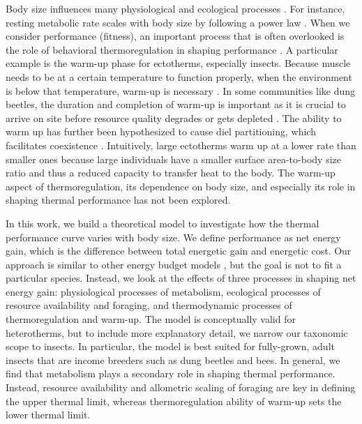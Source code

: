 Body size influences many physiological and ecological processes \citep{Peters1986}.
For instance, resting metabolic rate scales with body size by following a power law \citep{Kleiber1947, Peters1986, Gillooly2001,Brown2004}.
When we consider performance (fitness), an important process that is often overlooked is the role of behavioral thermoregulation in shaping performance \citep{Kearney2009b}. 
A particular example is the warm-up phase for ectotherms, especially insects.
Because muscle needs to be at a certain temperature to function properly, when the environment is below that temperature, warm-up is necessary \citep[e.g.,][]{Heinrich1975}. 
In some communities like dung beetles, the duration and completion of warm-up is important as it is crucial to arrive on site before resource quality degrades or gets depleted \citep{Hanski1991}. %
The ability to warm up has further been hypothesized to cause diel partitioning, which facilitates coexistence \citep{Viljanen2009}.
Intuitively, large ectotherms warm up at a lower rate than smaller ones because large individuals have a smaller surface area-to-body size ratio and thus a reduced capacity to transfer heat to the body.
The warm-up aspect of thermoregulation, its dependence on body size, and especially its role in shaping thermal performance has not been explored.
 
In this work, we build a theoretical model to investigate how the thermal performance curve varies with body size.
We define performance as net energy gain, which is the difference between total energetic gain and energetic cost. 
Our approach is similar to other energy budget models \citep[e.g.,][]{Kooijman2009}, but the goal is not to fit a particular species.
Instead, we look at the effects of three processes in shaping net energy gain: physiological processes of metabolism, ecological processes of resource availability and foraging, and thermodynamic processes of thermoregulation and warm-up.  %
The model is conceptually valid for heterotherms, but to include more explanatory detail, we narrow our taxonomic scope to insects.
In particular, the model is best suited for fully-grown, adult insects that are income breeders such as dung beetles and bees.
In general, we find that metabolism plays a secondary role in shaping thermal performance.
Instead, resource availability and allometric scaling of foraging are key in defining the upper thermal limit, whereas thermoregulation ability of warm-up sets the lower thermal limit.
